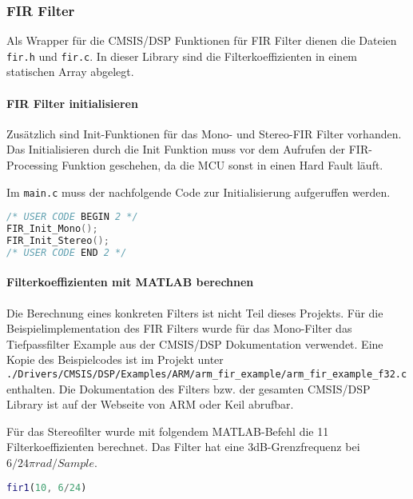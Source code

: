 \subsubsection{FIR Filter}
\label{sec:LibFIRFilter}

Als Wrapper für die CMSIS/DSP Funktionen für FIR Filter dienen die Dateien \texttt{fir.h} und \texttt{fir.c}. In dieser Library sind die Filterkoeffizienten in einem statischen Array abgelegt.


\paragraph{FIR Filter initialisieren}

Zusätzlich sind Init-Funktionen für das Mono- und Stereo-FIR Filter vorhanden. 
Das Initialisieren durch die Init Funktion muss vor dem Aufrufen der FIR-Processing Funktion geschehen, da die MCU sonst in einen Hard Fault läuft.

Im \texttt{main.c} muss der nachfolgende Code zur Initialisierung aufgeruffen werden.

\begin{lstlisting}[language=c]
/* USER CODE BEGIN 2 */
FIR_Init_Mono();
FIR_Init_Stereo();
/* USER CODE END 2 */
\end{lstlisting}


\paragraph{Filterkoeffizienten mit MATLAB berechnen}

Die Berechnung eines konkreten Filters ist nicht Teil dieses Projekts.
Für die Beispielimplementation des FIR Filters wurde für das Mono-Filter das Tiefpassfilter Example aus der CMSIS/DSP Dokumentation verwendet. 
Eine Kopie des Beispielcodes ist im Projekt unter \texttt{./Drivers/CMSIS/DSP/Examples/ARM/arm\_fir\_example/arm\_fir\_example\_f32.c} enthalten.
Die Dokumentation des Filters bzw. der gesamten CMSIS/DSP Library ist auf der Webseite von ARM \cite{cmsis-doc-arm} oder Keil \cite{cmsis-doc-keil} abrufbar.

Für das Stereofilter wurde mit folgendem MATLAB-Befehl die 11 Filterkoeffizienten berechnet. Das Filter hat eine 3dB-Grenzfrequenz bei $6/24 \pi rad/Sample$.


\begin{lstlisting}[language=matlab]
fir1(10, 6/24)
\end{lstlisting}


